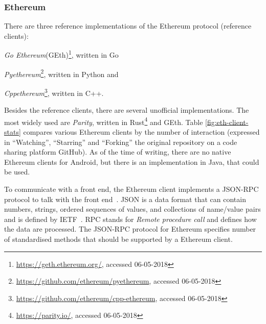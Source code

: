 \subsubsection{Ethereum}
There are three reference implementations of the Ethereum protocol (reference clients):
\begin{enumerate*}[label=(\roman*)]
    \item \textit{Go Ethereum}(GEth)\footnote{\url{https://geth.ethereum.org/}, accessed 06-05-2018}, written in Go
    \item \textit{Pyethereum}\footnote{\url{https://github.com/ethereum/pyethereum}, accessed 06-05-2018}, written in Python and
    \item \textit{Cppethereum}\footnote{\url{https://github.com/ethereum/cpp-ethereum}, accessed 06-05-2018}, written in C++.
\end{enumerate*}
Besides the reference clients, there are several unofficial implementations. The most widely used are \textit{Parity}, written in Rust\footnote{\url{https://parity.io/}, accessed 06-05-2018} and GEth. Table \ref{fig:eth-client-stats} compares various Ethereum clients by the number of interaction (expressed in ``Watching'', ``Starring'' and ``Forking'' the original repository on a code sharing platform GitHub). As of the time of writing, there are no native Ethereum clients for Android, but there is an implementation in Java, that could be used.

To communicate with a front end, the Ethereum client implements a JSON-RPC protocol to talk with the front end~\cite{Dannen2017IntroducingSolidity}. JSON is a data format that can contain numbers, strings, ordered sequences of values, and collections of name/value pairs and is defined by IETF~\cite{Crockford2006TheJSON}. RPC stands for \textit{Remote procedure call} and defines how the data are processed. The JSON-RPC protocol for Ethereum specifies number of standardised methods that should be supported by a Ethereum client\footnotemark.
% 
 
